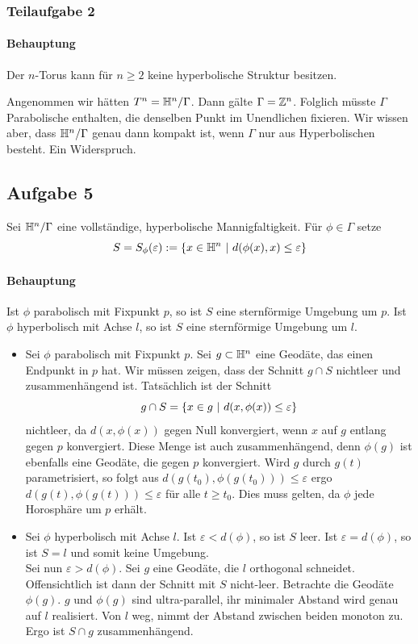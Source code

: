 \documentclass{book}
\renewcommand{\epsilon}{\varepsilon}
\begin{document}
\subsubsection{Teilaufgabe 2}
\paragraph{Behauptung}
Der $n$-Torus kann für $n\geq 2$ keine hyperbolische Struktur besitzen.
\begin{Beweis}{}
	Angenommen wir hätten $T^n = \mathbb{H}^n / \Gamma$. Dann gälte $\Gamma = \mathbb{Z}^n$. Folglich müsste $\Gamma$ Parabolische enthalten, die denselben Punkt im Unendlichen fixieren. Wir wissen aber, dass $\mathbb{H}^n / \Gamma$ genau dann kompakt ist, wenn $\Gamma$ nur aus Hyperbolischen besteht. Ein Widerspruch.
\end{Beweis}

\subsection{Aufgabe 5}
Sei $\mathbb{H}^n / \Gamma$ eine vollständige, hyperbolische Mannigfaltigkeit. Für $\phi \in \Gamma$ setze
\[S = S_\phi(\epsilon) := \set{x \in \H^n}{ d(\phi(x), x) \leq \epsilon } \] 
\paragraph{Behauptung}
Ist $\phi$ parabolisch mit Fixpunkt $p$, so ist $S$ eine sternförmige Umgebung um $p$. Ist $\phi$ hyperbolisch mit Achse $l$, so ist $S$ eine sternförmige Umgebung um $l$.
\begin{Beweis}{}
	\begin{itemize}
		\item Sei $\phi$ parabolisch mit Fixpunkt $p$. Sei $g \subset \mathbb{H}^n$ eine Geodäte, das einen Endpunkt in $p$ hat. Wir müssen zeigen, dass der Schnitt $g\cap S$ nichtleer und zusammenhängend ist. Tatsächlich ist der Schnitt
		\[ g\cap S = \set{ x \in g }{d(x, \phi(x))\leq \epsilon } \]
		nichtleer, da $d(x, \phi(x))$ gegen Null konvergiert, wenn $x$ auf $g$ entlang gegen $p$ konvergiert. Diese Menge ist auch zusammenhängend, denn $\phi(g)$ ist ebenfalls eine Geodäte, die gegen $p$ konvergiert. Wird $g$ durch $g(t)$ parametrisiert, so folgt aus $d(g(t_0), \phi(g(t_0))) \leq \epsilon$ ergo $d(g(t), \phi(g(t))) \leq \epsilon$ für alle $t\geq t_0$. Dies muss gelten, da $\phi$ jede Horosphäre um $p$ erhält.
		\item Sei $\phi$ hyperbolisch mit Achse $l$. Ist $\epsilon < d(\phi)$, so ist $S$ leer. Ist $\epsilon = d(\phi)$, so ist $S = l$ und somit keine Umgebung.\\
		Sei nun $\epsilon > d(\phi)$. Sei $g$ eine Geodäte, die $l$ orthogonal schneidet. Offensichtlich ist dann der Schnitt mit $S$ nicht-leer. Betrachte die Geodäte $\phi(g)$. $g$ und $\phi(g)$ sind ultra-parallel, ihr minimaler Abstand wird genau auf $l$ realisiert. Von $l$ weg, nimmt der Abstand zwischen beiden monoton zu. Ergo ist $S \cap g$ zusammenhängend.
	\end{itemize}
\end{Beweis}
\end{document}
